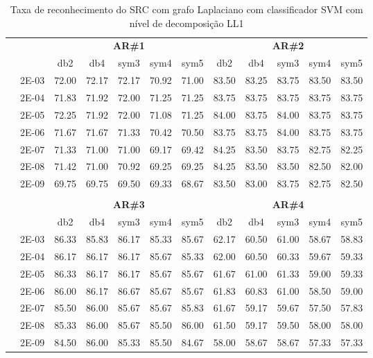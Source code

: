 \begin{table}[H]
	\centering
    \normalsize
	\caption{Taxa de reconhecimento do SRC com grafo Laplaciano com classificador SVM com nível de decomposição LL1}
	\begin{tabular}{|c|c|c c c c c|c c c c c|}
\cline{3-12}
\multicolumn{2}{c|}{\multirow{2}{*}{}} & \multicolumn{5}{c|}{\textbf{AR\#1}}  & \multicolumn{5}{c|}{\textbf{AR\#2}} \\\cline{3-12}

\multicolumn{2}{c|}{}  & db2 & db4 & sym3 & sym4 & sym5 & db2 & db4& sym3 & sym4 & sym5 \\\hline
\multicolumn{1}{|c|}{ \multirow{6}{*}{\rotatebox[origin=c]{90}{\textbf{Gamma}}} }
&2E-03&	72.00&	72.17&	72.17&	70.92&	71.00&	83.50&	83.25&	83.75&	83.50&	83.50	\\\cline{2-12}
&2E-04&	71.83&	71.92&	72.00&	71.25&	71.25&	83.75&	83.75&	83.75&	83.75&	83.75	\\\cline{2-12}
&2E-05&	72.25&	71.92&	72.00&	71.08&	71.25&	84.00&	83.75&	84.00&	83.75&	83.75	\\\cline{2-12}
&2E-06&	71.67&	71.67&	71.33&	70.42&	70.50&	83.75&	83.75&	84.00&	83.75&	83.75	\\\cline{2-12}
&2E-07&	71.33&	71.00&	71.00&	69.17&	69.42&	84.25&	83.50&	83.75&	82.75&	82.25	\\\cline{2-12}
&2E-08&	71.42&	71.00&	70.92&	69.25&	69.25&	84.25&	83.50&	83.50&	82.50&	82.00	\\\cline{2-12}
&2E-09&	69.75&	69.75&	69.50&	69.33&	68.67&	83.50&	83.00&	83.75&	82.75&	82.50	
	



	
\\ \midrule
\multicolumn{12}{c}{}\\ 

\cline{3-12}
\multicolumn{2}{c}{} & \multicolumn{5}{|c|}{\textbf{AR\#3}}  & \multicolumn{5}{c|}{\textbf{AR\#4}} \\\cline{3-12}
\multicolumn{2}{c}{}  & \multicolumn{1}{|c}{db2} & db4 & sym3 & sym4 & sym5 & db2 & db4& sym3 & sym4 & sym5 \\\hline
\multicolumn{1}{|c|}{ \multirow{6}{*}{\rotatebox[origin=c]{90}{\textbf{Gamma}}} }
&2E-03&	86.33&	85.83&	86.17&	85.33&	85.67&	62.17&	60.50&	61.00&	58.67&	58.83	\\\cline{2-12}
&2E-04&	86.17&	86.17&	86.17&	85.67&	85.33&	62.00&	60.50&	60.33&	59.67&	59.33	\\\cline{2-12}
&2E-05&	86.33&	86.17&	86.17&	85.67&	85.67&	61.67&	61.00&	61.33&	59.00&	59.33	\\\cline{2-12}
&2E-06&	86.00&	86.17&	86.67&	85.67&	85.67&	61.83&	60.83&	61.00&	58.50&	59.00	\\\cline{2-12}
&2E-07&	85.50&	86.00&	85.67&	85.67&	85.83&	61.67&	59.17&	59.67&	57.50&	57.83	\\\cline{2-12}
&2E-08&	85.33&	86.00&	85.67&	85.50&	86.00&	61.50&	59.17&	59.50&	58.00&	58.00	\\\cline{2-12}
&2E-09&	84.50&	86.00&	85.33&	85.50&	84.67&	58.00&	58.67&	58.67&	57.33&	57.33	


\end{tabular}
\end{table}
